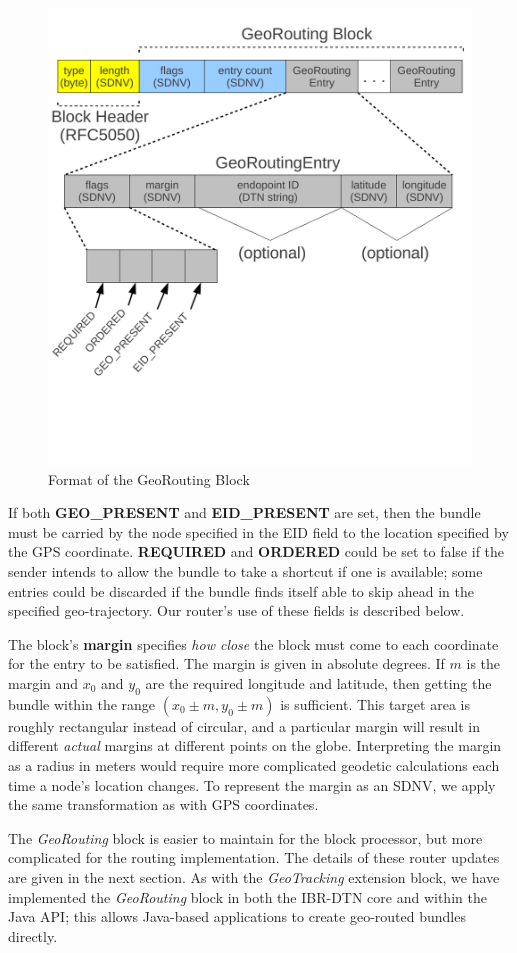 \begin{figure}
\begin{center}
\includegraphics[width=.8\columnwidth]{figures/georouting-block.pdf}
\end{center}
\vspace{-.75cm}
\caption{Format of the GeoRouting Block}
\label{fig:georouting-block}
\vspace{-.5cm}
\end{figure}

If both {\bf GEO\_PRESENT} and {\bf EID\_PRESENT} are set, then the bundle must be carried by the node specified in the EID field to the location specified by the GPS coordinate.  {\bf REQUIRED} and {\bf ORDERED} could be set to false if the sender intends to allow the bundle to take a shortcut if one is available; some entries could be discarded if the bundle finds itself able to skip ahead in the specified geo-trajectory. Our router's use of these fields is described below.

The block's {\bf margin} specifies {\em how close} the block must come to each coordinate for the entry to be satisfied. The margin is given in absolute degrees. If $m$ is the margin and $x_0$ and $y_0$ are the required longitude and latitude, then getting the bundle within the range $(x_0\pm m, y_0\pm m)$ is sufficient.  This target area is roughly rectangular instead of circular, and a particular margin will result in different {\it actual} margins at different points on the globe.  Interpreting the margin as a radius in meters would require more complicated geodetic calculations each time a node's location changes. To represent the margin as an SDNV, we apply the same transformation as with GPS coordinates.

The {\em GeoRouting} block is easier to maintain for the block processor, but more complicated for the routing implementation. The details of these router updates are given in the next section. As with the {\em GeoTracking} extension block, we have implemented the {\em GeoRouting} block in both the IBR-DTN core and within the Java API; this allows Java-based applications to create geo-routed bundles directly.


